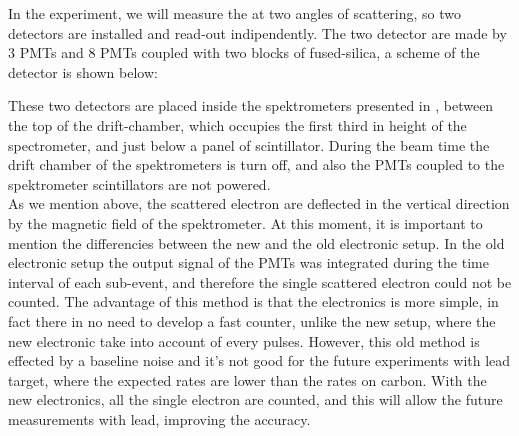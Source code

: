 In the experiment, we will measure the \transv at two angles of scattering, so two detectors are installed and read-out indipendently. The two detector are made by 3 PMTs and 8 PMTs coupled with two blocks of fused-silica, a scheme of the detector is shown below:

\begin{figure}[hbtp]
\centering
{}
\end{figure}


These  two detectors are placed inside the spektrometers presented in , between the top of the drift-chamber, which occupies the first third in height of the spectrometer, and just below a panel of scintillator. During the beam time the drift chamber of the spektrometers is turn off, and also the PMTs coupled to the spektrometer scintillators are not powered.\\
As we mention above, the scattered electron are deflected in the vertical direction by the magnetic field of the spektrometer. 
At this moment, it is important to mention the differencies between the new and the old electronic setup. In the old electronic setup the output signal of the PMTs was integrated during the time interval of each sub-event, and therefore the single scattered electron could not be counted. The advantage of this method is that the electronics is more simple, in fact there in no need to develop a fast counter, unlike the new setup, where the new electronic take into account of every pulses. However, this old method is effected by a baseline noise and it's not good for the future experiments with lead target, where the expected rates are lower than the rates on carbon.
With the new electronics, all the single electron are counted, and this will allow the future measurements with lead, improving the accuracy. 

